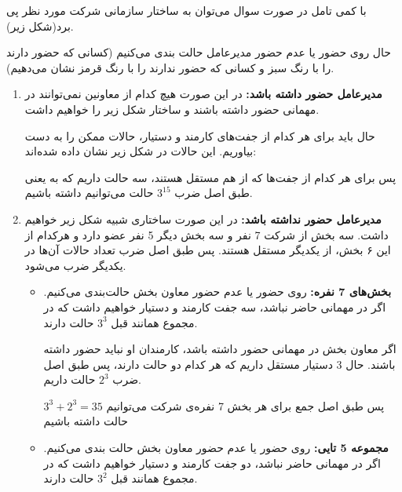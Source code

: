 \p
با کمی تامل در صورت سوال می‌توان به ساختار سازمانی شرکت مورد نظر پی برد(شکل زیر).

\p
{}
\p

حال روی حضور یا عدم حضور مدیرعامل حالت بندی می‌کنیم
(کسانی که حضور دارند را با رنگ سبز و کسانی که حضور ندارند را با رنگ قرمز نشان می‌دهیم).
    
\begin{enumerate}
    \item 
    \textbf{مدیرعامل حضور داشته باشد:}
    در این صورت هیچ کدام از معاونین نمی‌توانند در مهمانی حضور داشته باشند و ساختار شکل زیر را خواهیم داشت.

    \p
    \p
        
    حال باید برای هر کدام از جفت‌های کارمند و دستیار، حالات ممکن را به دست بیاوریم. این حالات در شکل زیر نشان داده شده‌اند:

    \p
    \p
    
    پس برای هر کدام از جفت‌ها که از هم مستقل هستند، سه حالت داریم که به یعنی طبق اصل ضرب
    $3^{15}$
    حالت می‌توانیم داشته باشیم.
    
    \item 
    \textbf{مدیرعامل حضور نداشته باشد:}
    در این صورت ساختاری شبیه شکل زیر خواهیم داشت. سه بخش از شرکت 7 نفر و سه بخش دیگر 5 نفر عضو دارد و هرکدام از این ۶ بخش، از یکدیگر مستقل هستند. پس طبق اصل ضرب تعداد حالات آن‌ها در یکدیگر ضرب می‌شود.
    
    \p
    \p
    
    \begin{itemize}
        \item 
        \textbf{بخش‌های 7 نفره:}
        روی حضور یا عدم حضور معاون بخش حالت‌بندی می‌کنیم. اگر در مهمانی حاضر نباشد، سه جفت کارمند و دستیار خواهیم داشت که در مجموع همانند قبل
        $3^3$
        حالت دارند.

        \p
        \p
        
        اگر معاون بخش در مهمانی حضور داشته باشد، کارمندان او نباید حضور داشته باشند. حال 3 دستیار مستقل داریم که هر کدام دو حالت دارند، پس طبق اصل ضرب
        $2^3$
        حالت داریم.

        \p
        \p
        
        پس طبق اصل جمع برای هر بخش 7 نفره‌ی شرکت می‌توانیم $3^3 + 2^3 = 35 $ حالت داشته باشیم
        
        \item 
        \textbf{مجموعه 5 تایی:}
        روی حضور یا عدم حضور معاون بخش حالت بندی می‌کنیم.
        اگر در مهمانی حاضر نباشد، دو جفت کارمند و دستیار خواهیم داشت  که در مجموع همانند قبل
        $3^2$
        حالت دارند.


\end{itemize}
\end{enumerate}
